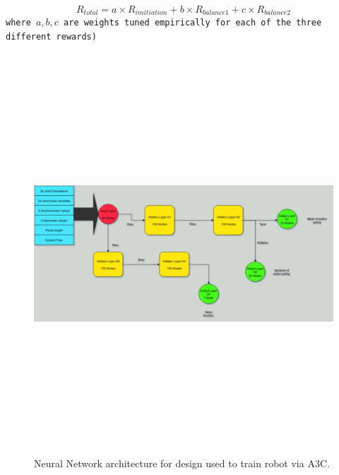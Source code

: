 $$R_{total} = a \times R_{imitiation} + b \times R_{balance1} + c \times R_{balance2}$$
\texttt{where $a,b,c$ are weights tuned empirically for each of the three different rewards)}
\vspace{1em}
\\
\begin{figure}
\centering
  \includegraphics[width=1\linewidth, height=15cm,keepaspectratio]{images/neural_net.png}
  \caption{Neural Network architecture for design used to train robot via A3C.}
  \label{fig:neural_net}
\end{figure}

